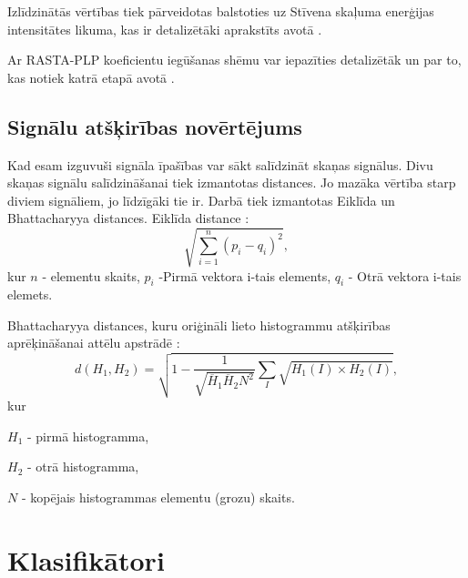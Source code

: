 \documentclass[12pt,paper=A4]{report}
\begin{document}
Izlīdzinātās vērtības tiek pārveidotas balstoties uz Stīvena skaļuma enerģijas intensitātes likuma, kas ir detalizētāki aprakstīts avotā \cite{http://acousticslab.org/psychoacoustics/PMFiles/Module04.htm}. 

Ar RASTA-PLP koeficientu iegūšanas shēmu var iepazīties detalizētāk un par to, kas notiek katrā etapā avotā \cite{http://www.icsi.berkeley.edu/pubs/techreports/tr-91-069.pdf}.



\section{Signālu atšķirības novērtējums}
Kad esam izguvuši signāla īpašības var sākt salīdzināt skaņas signālus. Divu skaņas signālu salīdzināšanai tiek izmantotas distances. Jo mazāka vērtība starp diviem signāliem, jo līdzīgāki tie ir. Darbā tiek izmantotas Eiklīda un  Bhattacharyya distances. 
Eiklīda distance \cite{eucl}:
\begin{equation} \label{eq:1}
\sqrt{\sum\limits_{i=1}^n (p_{i} - q_{i})^2},
\end{equation}
kur
$n$ - elementu skaits,
$p_i$ -Pirmā vektora  i-tais elements,
$q_i$ - Otrā vektora i-tais elemets.
 

Bhattacharyya distances, kuru oriģināli lieto histogrammu atšķirības aprēķināšanai attēlu apstrādē \cite{https://pdfs.semanticscholar.org/75d0/f2a4a2dff5cce4eb4097c2e68e1ff75ae569.pdf}:
\begin{equation}
d(H_1,H_2) = \sqrt{1-\frac{1}{\sqrt{\overline{H}_1\overline{H}_2N^2}}\sum\limits_{I}\sqrt{H_1(I) \times H_2(I)}},
\end{equation}
kur

$H_1$ - pirmā histogramma,

$H_2$ - otrā histogramma,

$N$ - kopējais histogrammas elementu (grozu) skaits. 
 



\chapter{Klasifikātori}
\end{document}
